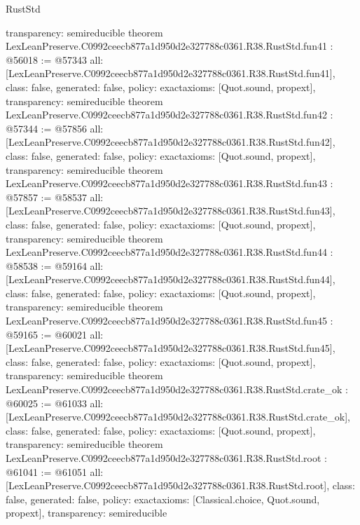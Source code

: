 \begin{lexlean}{RustStd}
\begin{coremodule}
{  transparency: semireducible
}
theorem LexLeanPreserve.C0992ceecb877a1d950d2e327788c0361.R38.RustStd.fun41 : @56018 := @57343 {
  all: [LexLeanPreserve.C0992ceecb877a1d950d2e327788c0361.R38.RustStd.fun41],
  class: false,
  generated: false,
  policy: exact{axioms: [Quot.sound, propext]},
  transparency: semireducible
}
theorem LexLeanPreserve.C0992ceecb877a1d950d2e327788c0361.R38.RustStd.fun42 : @57344 := @57856 {
  all: [LexLeanPreserve.C0992ceecb877a1d950d2e327788c0361.R38.RustStd.fun42],
  class: false,
  generated: false,
  policy: exact{axioms: [Quot.sound, propext]},
  transparency: semireducible
}
theorem LexLeanPreserve.C0992ceecb877a1d950d2e327788c0361.R38.RustStd.fun43 : @57857 := @58537 {
  all: [LexLeanPreserve.C0992ceecb877a1d950d2e327788c0361.R38.RustStd.fun43],
  class: false,
  generated: false,
  policy: exact{axioms: [Quot.sound, propext]},
  transparency: semireducible
}
theorem LexLeanPreserve.C0992ceecb877a1d950d2e327788c0361.R38.RustStd.fun44 : @58538 := @59164 {
  all: [LexLeanPreserve.C0992ceecb877a1d950d2e327788c0361.R38.RustStd.fun44],
  class: false,
  generated: false,
  policy: exact{axioms: [Quot.sound, propext]},
  transparency: semireducible
}
theorem LexLeanPreserve.C0992ceecb877a1d950d2e327788c0361.R38.RustStd.fun45 : @59165 := @60021 {
  all: [LexLeanPreserve.C0992ceecb877a1d950d2e327788c0361.R38.RustStd.fun45],
  class: false,
  generated: false,
  policy: exact{axioms: [Quot.sound, propext]},
  transparency: semireducible
}
theorem LexLeanPreserve.C0992ceecb877a1d950d2e327788c0361.R38.RustStd.crate_ok : @60025 := @61033 {
  all: [LexLeanPreserve.C0992ceecb877a1d950d2e327788c0361.R38.RustStd.crate_ok],
  class: false,
  generated: false,
  policy: exact{axioms: [Quot.sound, propext]},
  transparency: semireducible
}
theorem LexLeanPreserve.C0992ceecb877a1d950d2e327788c0361.R38.RustStd.root : @61041 := @61051 {
  all: [LexLeanPreserve.C0992ceecb877a1d950d2e327788c0361.R38.RustStd.root],
  class: false,
  generated: false,
  policy: exact{axioms: [Classical.choice, Quot.sound, propext]},
  transparency: semireducible
}


\end{coremodule}
\end{lexlean}
